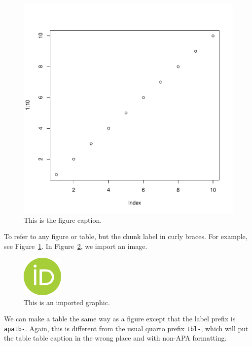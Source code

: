 \documentclass[
  floatsintext,
  man,
  colorlinks=true,linkcolor=blue,citecolor=blue,urlcolor=blue,biblatex]{apa7}
\begin{document}
\begin{figure}[h!]
\caption{This is the figure caption.}
\label{apafg-myplot}
\includegraphics[width=6.5 in]{template_files/figure-pdf/apafg-myplot-1.pdf}




\end{figure}

To refer to any figure or table, but the chunk label in curly braces.
For example, see Figure~\ref{apafg-myplot}. In
Figure~\ref{apafg-importedgraphic}, we import an image.

\begin{figure}[h!]
\caption{This is an imported graphic.}
\label{apafg-importedgraphic}
\includegraphics[width=2cm]{ORCID.pdf}

\end{figure}

We can make a table the same way as a figure except that the label
prefix is \texttt{apatb-}. Again, this is different from the usual
quarto prefix \texttt{tbl-}, which will put the table table caption in
the wrong place and with non-APA formatting.
\end{document}
